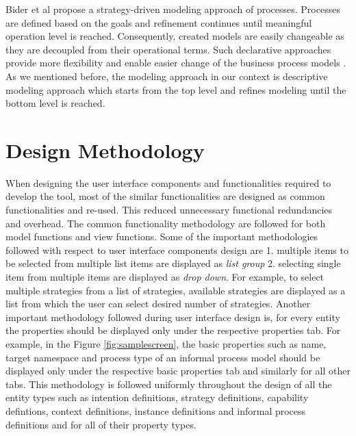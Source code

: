 Bider et al \cite{bider2005strategy} propose a strategy-driven modeling approach of processes. Processes are defined based on the goals and refinement continues until meaningful operation level is reached. Consequently, created models are easily changeable as they are decoupled from their operational terms. Such declarative approaches provide more flexibility and enable easier change of the business process models \cite{Sungur2016}. As we mentioned before, the modeling approach in our context is descriptive modeling approach which starts from the top level and refines modeling until the bottom level is reached. 

\section{Design Methodology}
\label{sec:designmethodology}
When designing the user interface components and functionalities required to develop the tool, most of the similar functionalities are 
designed as common functionalities and re-used. This reduced unnecessary functional redundancies and overhead. The common functionality methodology are followed for both model functions and view functions.  Some of the important methodologies followed with respect to user interface components design are 1. multiple items to be selected from multiple list items are displayed as  \textit{list group} 2. selecting single item from multiple items are displayed as \textit{drop down}. For example, to select multiple strategies from a list of strategies, available strategies are displayed as a list from which the user can select desired number of strategies. Another important methodology followed during user interface design is, for every entity the properties should be displayed only under the respective properties tab. For example, in the Figure \ref{fig:samplescreen}, the basic properties such as name, target namespace and process type of an informal process model should be displayed only under the respective basic properties tab and similarly for all other tabs. This methodology is followed uniformly throughout the design of all the entity types such as intention definitions, strategy definitions, capability defintions, context definitions, instance definitions and informal process definitions and for all of their property types. 

